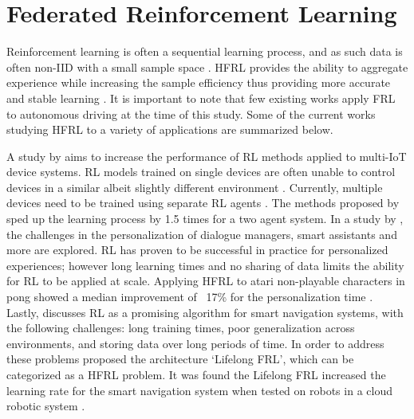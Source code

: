 \section{Federated Reinforcement Learning}

Reinforcement learning is often a sequential learning process, and as such data is often non-IID with a small sample space \cite{sutton2018reinforcement}.  HFRL provides the ability to aggregate experience while increasing the sample efficiency thus providing more accurate and stable learning  \cite{IntelAI19}. It is important to note that few existing works apply FRL to autonomous driving at the time of this study.  Some of the current works studying HFRL to a variety of applications are summarized below.

A study by \cite{Lim2020} aims to increase the performance of RL methods applied to multi-IoT device systems.  RL models trained on single devices are often unable to control devices in a similar albeit slightly different environment \cite{Lim2020}.  Currently, multiple devices need to be trained using separate RL agents \cite{Lim2020}. The methods proposed by \cite{Lim2020} sped up the learning process by 1.5 times for a two agent system. In a study by \cite{Nadiger2019}, the challenges in the personalization of dialogue managers, smart assistants and more are explored.  RL has proven to be successful in practice for personalized experiences; however long learning times and no sharing of data limits the ability for RL to be applied at scale.  Applying HFRL to atari non-playable characters in pong showed a median improvement of ~17\% for the personalization time \cite{Nadiger2019}. Lastly, \cite{Liu2019b} discusses RL as a promising algorithm for smart navigation systems, with the following challenges: long training times, poor generalization across environments, and storing data over long periods of time.  In order to address these problems \cite{Liu2019b} proposed the architecture `Lifelong FRL', which can be categorized as a HFRL problem.  It was found the Lifelong FRL increased the learning rate for the smart navigation system when tested on robots in a cloud robotic system \cite{Liu2019b}.

